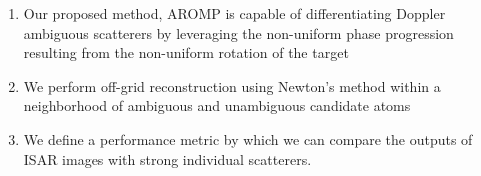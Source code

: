 \begin{enumerate}
    \item Our proposed method, AROMP is capable of differentiating Doppler ambiguous scatterers by leveraging the non-uniform phase progression resulting from the non-uniform rotation of the target
    \item We perform off-grid reconstruction using Newton's method within a neighborhood of ambiguous and unambiguous candidate atoms
    \item We define a performance metric by which we can compare the outputs of ISAR images with strong individual scatterers.
\end{enumerate}
